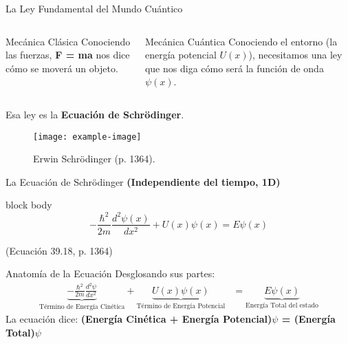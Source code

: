 \documentclass{beamer}
\begin{document}
\begin{frame}{La Ley Fundamental del Mundo Cuántico}
  \begin{columns}
      \begin{block}{Mecánica Clásica}
        Conociendo las fuerzas, \textbf{F = ma} nos dice cómo se moverá un objeto.
      \end{block}
      \begin{block}{Mecánica Cuántica}
        Conociendo el entorno (la energía potencial $U(x)$), necesitamos una ley que nos diga cómo será la función de onda $\psi(x)$.
      \end{block}
  \end{columns}
  \vfill
  \centering
  Esa ley es la \textbf{Ecuación de Schrödinger}.
  \begin{figure}
    \texttt{[image: example-image]} %
    \caption{Erwin Schrödinger (p. 1364).}
  \end{figure}
\end{frame}

\begin{frame}{La Ecuación de Schrödinger}
  \centering\textbf{(Independiente del tiempo, 1D)}\medskip
  \begin{beamercolorbox}[sep=0.3cm,center,wd=\textwidth]{block body}
  \Huge
  \begin{equation*}
    -\frac{\hbar^2}{2m} \frac{d^2\psi(x)}{dx^2} + U(x)\psi(x) = E\psi(x)
  \end{equation*}
  \end{beamercolorbox}
  \medskip
  \centering (Ecuación 39.18, p. 1364)
\end{frame}

\begin{frame}{Anatomía de la Ecuación}
  Desglosando sus partes:
  \begin{align*}
    \underbrace{-\frac{\hbar^2}{2m} \frac{d^2\psi}{dx^2}}_{\text{Término de Energía Cinética}} + \underbrace{U(x)\psi(x)}_{\text{Término de Energía Potencial}} &= \underbrace{E\psi(x)}_{\text{Energía Total del estado}}
  \end{align*}
  \vspace{1em}
  La ecuación dice: \textbf{(Energía Cinética + Energía Potencial)$\psi$ = (Energía Total)$\psi$}
\end{frame}
\end{document}
